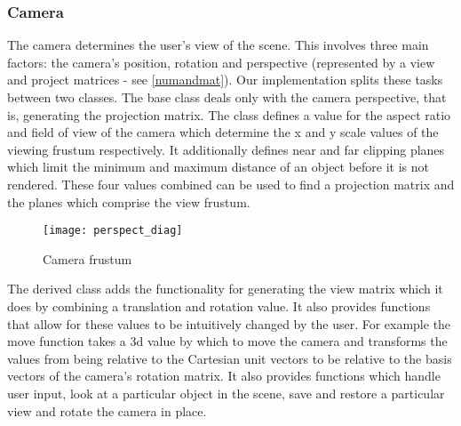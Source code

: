 \pagebreak
\subsubsection{Camera}

The camera determines the user's view of the scene. This involves three main factors: the camera's position, rotation and perspective (represented by a view and project matrices - see \cref{numandmat}).
Our implementation splits these tasks between two classes. The base class deals only with the camera perspective, that is, generating the projection matrix. The class defines a value for the aspect ratio and field of view of the camera which determine the x and y scale values of the viewing frustum respectively. It additionally defines near and far clipping planes which limit the minimum and maximum distance of an object before it is not rendered. These four values combined can be used to find a projection matrix and the planes which comprise the view frustum.

\begin{figure}[!htbp]
  \begin{center}
    \leavevmode
    \ifpdf
      \texttt{[image: perspect\_diag]}
    \fi
    \caption[Camera frustum]{Camera frustum\protect\footnotemark}
    \label{FigFrustumDiag}
  \end{center}
\end{figure}


The derived class adds the functionality for generating the view matrix which it does by combining a translation and rotation value. It also provides functions that allow for these values to be intuitively changed by the user. For example the move function takes a 3d value by which to move the camera and transforms the values from being relative to the Cartesian unit vectors to be relative to the basis vectors of the camera's rotation matrix. It also provides functions which handle user input, look at a particular object in the scene, save and restore a particular view and rotate the camera in place.

\pagebreak

